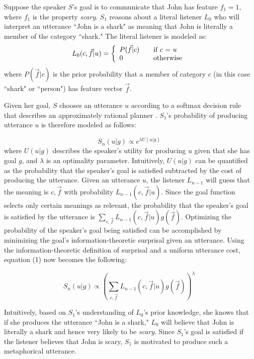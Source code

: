 \documentclass[10pt,letterpaper]{article}
\begin{document}
Suppose the speaker $S$'s goal is to communicate that John has feature $f_1 =1$, where $f_1$ is the property \emph{scary}. $S_1$ reasons about a literal listener $L_0$ who will interpret an utterance ``John is a shark" as meaning that John is literally a member of the category ``shark." The literal listener is modeled as:
\[ L_0(c, \vec f |u) = \left\{ 
  \begin{array}{l l}
    P(\vec f | c) & \quad \text{if $c$ = $u$}\\
    0 & \quad \text{otherwise}
  \end{array} \right.\]
where $P(\vec f | c)$ is the prior probability that a member of category $c$ (in this case ``shark" or ``person") has feature vector $\vec f$.

Given her goal, $S$ chooses an utterance $u$ according to a softmax decision rule that describes an approximately rational planner \cite{sutton1998reinforcement}. $S_1$'s probability of producing utterance $u$ is therefore modeled as follows: 

\begin{equation}
S_n(u | g) \propto e^{\lambda U(u |  g)}
\end{equation}
where $U(u | g)$ describes the speaker's utility for producing $u$ given that she has goal $g$, and $\lambda$ is an optimality parameter. Intuitively, $U(u |  g)$ can be quantified as the probability that the speaker's goal is satisfied subtracted by the cost of producing the utterance. Given an utterance $u$, the listener $L_{n-1}$ will guess that the meaning is $c, \vec f$ with probability $L_{n-1} (c, \vec f|u)$. Since the goal function selects only certain meanings as relevant, the probability that the speaker's goal is satisfied by the utterance is $
\sum_{c, \vec f}{L_{n-1} (c, \vec f|u) g(\vec f)}$. Optimizing the probability of the speaker's goal being satisfied can be accomplished by minimizing the goal's information-theoretic surprisal given an utterance. Using the information-theoretic definition of surprisal and a uniform utterance cost, equation (1) now becomes the following:

\begin{equation}
S_n (u | g) \propto ( \sum_{c,\vec f}{L_{n-1} (c,\vec f|u) g(\vec f)}) ^\lambda
\end{equation}

Intuitively, based on $S_1$'s understanding of $L_0$'s prior knowledge, she knows that if she produces the utterance ``John is a shark," $L_0$ will believe that John is literally a shark and hence very likely to be \emph{scary}. Since $S_1$'s goal is satisfied if the listener believes that John is scary, $S_1$ is motivated to produce such a metaphorical utterance. 
\end{document}
